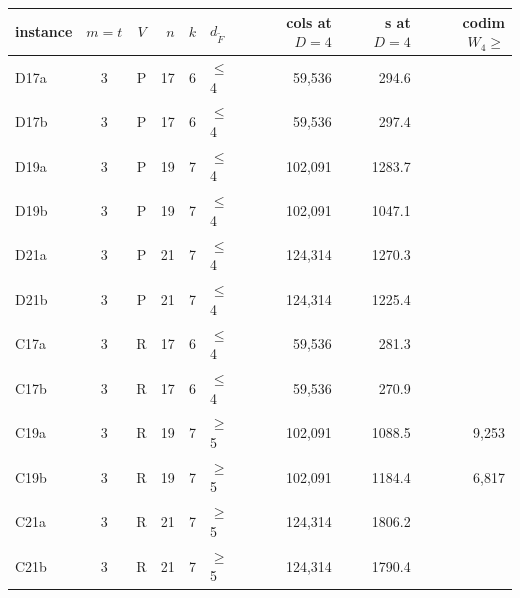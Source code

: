 \begin{tabular}{@{}lccrrlrrr@{}}
\toprule
instance & $m=t$ & $V$ & $n$ & $k$ & $d_{\tilde F}$ & cols at $D=4$ & s at $D=4$ & codim $W_4\ge$ \\
\midrule
D17a & 3 & P & 17 & 6 & $\le$4 & 59{,}536 & 294.6 &  \\
D17b & 3 & P & 17 & 6 & $\le$4 & 59{,}536 & 297.4 &  \\
D19a & 3 & P & 19 & 7 & $\le$4 & 102{,}091 & 1283.7 &  \\
D19b & 3 & P & 19 & 7 & $\le$4 & 102{,}091 & 1047.1 &  \\
D21a & 3 & P & 21 & 7 & $\le$4 & 124{,}314 & 1270.3 &  \\
D21b & 3 & P & 21 & 7 & $\le$4 & 124{,}314 & 1225.4 &  \\
C17a & 3 & R & 17 & 6 & $\le$4 & 59{,}536 & 281.3 &  \\
C17b & 3 & R & 17 & 6 & $\le$4 & 59{,}536 & 270.9 &  \\
C19a & 3 & R & 19 & 7 & $\ge$5 & 102{,}091 & 1088.5 & 9{,}253 \\
C19b & 3 & R & 19 & 7 & $\ge$5 & 102{,}091 & 1184.4 & 6{,}817 \\
C21a & 3 & R & 21 & 7 & $\ge$5 & 124{,}314 & 1806.2 &  \\
C21b & 3 & R & 21 & 7 & $\ge$5 & 124{,}314 & 1790.4 &  \\
\bottomrule
\end{tabular}
